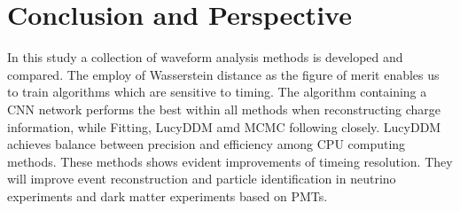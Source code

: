\section{Conclusion and Perspective} %
\label{sec:conclusion}

In this study a collection of waveform analysis methods is developed and compared. The employ of Wasserstein distance as the figure of merit enables us to train algorithms which are sensitive to timing. The algorithm containing a CNN network performs the best within all methods when reconstructing charge information, while Fitting, LucyDDM amd MCMC following closely. LucyDDM achieves balance between precision and efficiency among CPU computing methods. These methods shows evident improvements of timeing resolution. They will improve event reconstruction and particle identification in neutrino experiments and dark matter experiments based on PMTs. 

